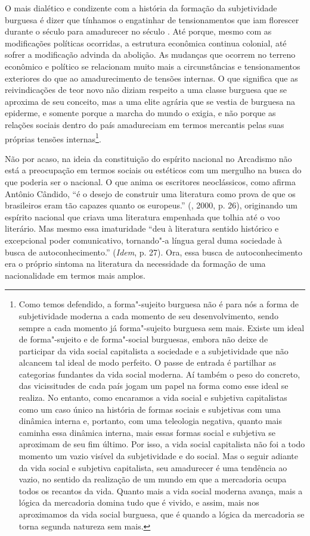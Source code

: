 O mais dialético e condizente com a história da formação da
subjetividade burguesa é dizer que tínhamos o engatinhar de
tensionamentos que iam florescer durante o século  para amadurecer no
século . Até porque, mesmo com as modificações políticas ocorridas, a
estrutura econômica continua colonial, até sofrer a modificação advinda
da abolição. As mudanças que ocorrem no terreno econômico e político se
relacionam muito mais a circunstâncias e tensionamentos exteriores do
que ao amadurecimento de tensões internas. O que significa que as
reivindicações de teor novo não diziam respeito a uma classe burguesa
que se aproxima de seu conceito, mas a uma elite agrária que se vestia
de burguesa na epiderme, e somente porque a marcha do mundo o exigia, e
não porque as relações sociais dentro do país amadureciam em termos
mercantis pelas suas próprias tensões internas\footnote{Como temos
  defendido, a forma"-sujeito burguesa não é para nós a forma de
  subjetividade moderna a cada momento de seu desenvolvimento, sendo
  sempre a cada momento já forma"-sujeito burguesa sem mais. Existe um
  ideal de forma"-sujeito e de forma"-social burguesas, embora não deixe
  de participar da vida social capitalista a sociedade e a subjetividade
  que não alcancem tal ideal de modo perfeito. O passe de entrada é
  partilhar as categorias fundantes da vida social moderna. Aí também o
  peso do concreto, das vicissitudes de cada país jogam um papel na
  forma como esse ideal se realiza. No entanto, como encaramos a vida
  social e subjetiva capitalistas como um caso único na história de
  formas sociais e subjetivas com uma dinâmica interna e, portanto, com
  uma teleologia negativa, quanto mais caminha essa dinâmica interna,
  mais essas formas social e subjetiva se aproximam de seu fim último.
  Por isso, a vida social capitalista não foi a todo momento um vazio
  visível da subjetividade e do social. Mas o seguir adiante da vida
  social e subjetiva capitalista, seu amadurecer é uma tendência ao
  vazio, no sentido da realização de um mundo em que a mercadoria ocupa
  todos os recantos da vida. Quanto mais a vida social moderna avança,
  mais a lógica da mercadoria domina tudo que é vivido, e assim, mais
  nos aproximamos da vida social burguesa, que é quando a lógica da
  mercadoria se torna segunda natureza sem mais.}.

Não por acaso, na ideia da constituição do espírito nacional no
Arcadismo não está a preocupação em termos sociais ou estéticos com um
mergulho na busca do que poderia ser o nacional. O que anima os
escritores neoclássicos, como afirma Antônio Cândido, ``é o desejo de
construir uma literatura como prova de que os brasileiros eram tão
capazes quanto os europeus.'' (, 2000, p. 26), originando um
espírito nacional que criava uma literatura empenhada que tolhia até o
voo literário. Mas mesmo essa imaturidade ``deu à literatura sentido
histórico e excepcional poder comunicativo, tornando"-a língua geral duma
sociedade à busca de autoconhecimento.'' (\emph{Idem}, p. 27). Ora, essa
busca de autoconhecimento era o próprio sintoma na literatura da
necessidade da formação de uma nacionalidade em termos mais amplos.

